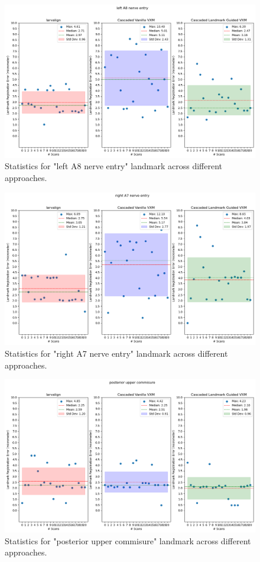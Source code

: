 \documentclass{report}
\begin{document}
\begin{figure}[h!]
	\centering
	\includegraphics[width=0.7\columnwidth]{resources/chapter5_fresh/output/left A8 nerve entry.png}
	\caption{Statistics for "left A8 nerve entry" landmark across different approaches.}
	\label{fig:landmark26}
\end{figure}

\begin{figure}[h!]
	\centering
	\includegraphics[width=0.7\columnwidth]{resources/chapter5_fresh/output/right A7 nerve entry.png}
	\caption{Statistics for "right A7 nerve entry" landmark across different approaches.}
	\label{fig:landmark27}
\end{figure}

\begin{figure}[h!]
	\centering
	\includegraphics[width=0.7\columnwidth]{resources/chapter5_fresh/output/posterior upper commisure.png}
	\caption{Statistics for "posterior upper commisure" landmark across different approaches.}
	\label{fig:landmark28}
\end{figure}
\end{document}
